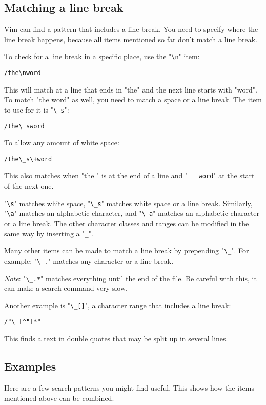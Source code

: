 \subsection{Matching a line break}
Vim can find a pattern that includes a line break.
You need to specify where the line break happens, because all items mentioned so far don't match a line break.

To check for a line break in a specific place, use the "\verb!\n!" item:

\begin{Verbatim}[samepage=true]
 /the\nword
\end{Verbatim}

This will match at a line that ends in "the" and the next line starts with "word".
To match "the word" as well, you need to match a space or a line break.
The item to use for it is "\verb!\_s!":

\begin{Verbatim}[samepage=true]
 /the\_sword
\end{Verbatim}

To allow any amount of white space:

\begin{Verbatim}[samepage=true]
 /the\_s\+word
\end{Verbatim}

This also matches when "the  " is at the end of a line and "\verb!   word!" at the start of the next one.

"\verb!\s!" matches white space, "\verb!\_s!" matches white space or a line break.
Similarly, "\verb!\a!" matches an alphabetic character, and "\verb!\_a!" matches an alphabetic character or a line break.
The other character classes and ranges can be modified in the same way by inserting a "\verb!_!".

Many other items can be made to match a line break by prepending "\verb!\_!".
For example: "\verb!\_.!" matches any character or a line break.

\emph{Note}: "\verb!\_.*!" matches everything until the end of the file.
Be careful with this, it can make a search command very slow.

Another example is "\verb!\_[]!", a character range that includes a line break:

\begin{Verbatim}[samepage=true]
 /"\_[^"]*"
\end{Verbatim}

This finds a text in double quotes that may be split up in several lines.
\subsection{Examples}
Here are a few search patterns you might find useful.
This shows how the items mentioned above can be combined.

